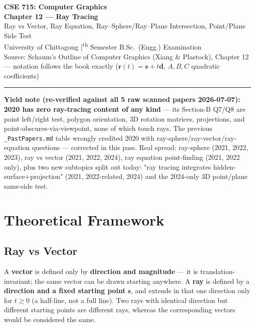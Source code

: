 \documentclass[12pt, a4paper]{article}
\newenvironment{answerbox}{\begin{mdframed}[style=answerframe]}{\end{mdframed}}
\newenvironment{notesbox}{\begin{mdframed}[style=notesframe]}{\end{mdframed}}
\begin{document}
\begin{center}
  {\LARGE\bfseries\color{sectionblue} CSE 715: Computer Graphics}\\[0.6em]
  {\Large\bfseries Chapter 12 --- Ray Tracing}\\[0.3em]
  {\large Ray vs Vector, Ray Equation, Ray--Sphere/Ray--Plane Intersection, Point/Plane Side Test}\\[0.2em]
  {\normalsize University of Chittagong \quad|\textsuperscript{th} Semester B.Sc.\ (Engg.) Examination}\\[0.3em]
  {\small Source: Schaum's Outline of Computer Graphics (Xiang \& Plastock), Chapter 12 --- notation follows the book exactly ($\mathbf{r}(t)=\mathbf{s}+t\mathbf{d}$, $A,B,C$ quadratic coefficients)}
\end{center}

\vspace{0.3em}\noindent\rule{\linewidth}{1pt}\vspace{0.5em}

\begin{notesbox}
\textbf{Yield note (re-verified against all 5 raw scanned papers 2026-07-07):} \textbf{2020 has zero ray-tracing content of any kind} --- its Section-B Q7/Q8 are point left/right test, polygon orientation, 3D rotation matrices, projections, and point-obscures-via-viewpoint, none of which touch rays. The previous \texttt{\_PastPapers.md} table wrongly credited 2020 with ray-sphere/ray-vector/ray-equation questions --- corrected in this pass. Real spread: ray-sphere (2021, 2022, 2023), ray vs vector (2021, 2022, 2024), ray equation point-finding (2021, 2022 only), plus two new subtopics split out today: "ray tracing integrates hidden-surface+projection" (2021, 2022-related, 2024) and the 2024-only 3D point/plane same-side test.
\end{notesbox}

\tableofcontents
\newpage

\section{Theoretical Framework}

\subsection{Ray vs Vector}
\begin{answerbox}
A \textbf{vector} is defined only by \textbf{direction and magnitude} --- it is translation-invariant; the same vector can be drawn starting anywhere. A \textbf{ray} is defined by a \textbf{direction and a fixed starting point} $\mathbf{s}$, and extends in that one direction only for $t\ge0$ (a half-line, not a full line). Two rays with identical direction but different starting points are different rays, whereas the corresponding vectors would be considered the same.
\end{answerbox}
\end{document}
